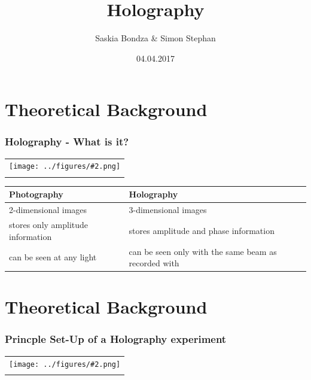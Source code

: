 \documentclass{beamer}
\title{Holography}
\author{Saskia Bondza \& Simon Stephan}
\date{04.04.2017}
\newcommand{\gra}[3][]{
	\begin{table}
	\centering
	\begin{tabular}[width=\textwidth]{c}
		\texttt{[image: ../figures/\#2.png]}\\
		\small #3
	\end{tabular}
	\end{table}
}
\begin{document}
\maketitle
\frame{\tableofcontents}
\section{Theoretical Background}
\frame{\tableofcontents[currentsection]}
\begin{frame}
	\frametitle{Holography - What is it?}
	\gra[0.35]{holo-schach}{}
		\begin{tabular}{p{5cm}|p{5cm}}
			\textbf{Photography}&\textbf{Holography}\\\hline
			2-dimensional images&3-dimensional images\\\hline
			stores only amplitude information&stores amplitude and phase information\\\hline
			can be seen at any light&can be seen only with the same beam as recorded with
		\end{tabular}
\end{frame}


\section{Theoretical Background}
\frame{\tableofcontents[currentsection]}
\begin{frame}
	\frametitle{Princple Set-Up of a Holography experiment}
	\gra[0.8]{PrincipleSetUp}{}
\end{frame}

\end{document}
